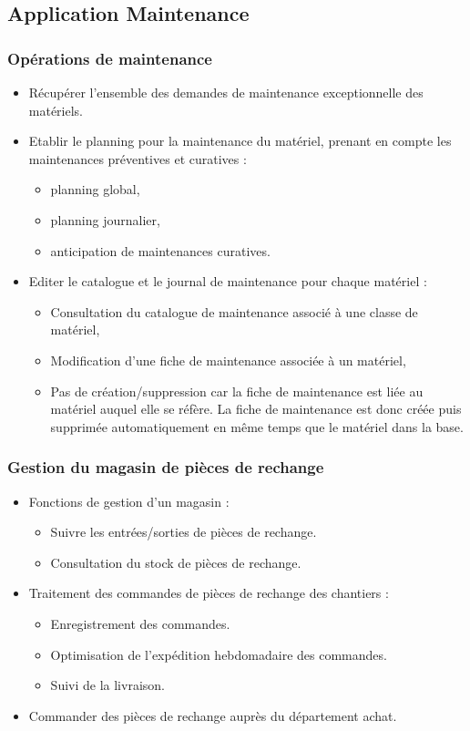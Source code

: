 \subsection{Application Maintenance}
\subsubsection{Opérations de maintenance}
\begin{itemize}
\item Récupérer l'ensemble des demandes de maintenance exceptionnelle
des matériels.
\item Etablir le planning pour la maintenance du matériel, prenant en
compte les maintenances préventives et curatives :
    \begin{itemize}
    \item planning global,
    \item planning journalier,
    \item anticipation de maintenances curatives.
    \end{itemize}
\item Editer le catalogue et le  journal de maintenance pour chaque matériel :
    \begin{itemize}
    \item Consultation du catalogue de maintenance associé à une classe de 
    matériel,
    \item Modification d'une fiche de maintenance associée à un matériel,
    \item Pas de création/suppression car la fiche de maintenance est liée
    au matériel auquel elle se réfère. La fiche de maintenance est donc
    créée puis supprimée automatiquement en même temps que le matériel dans
    la base.
    \end{itemize}
\end{itemize}

\subsubsection{Gestion du magasin de pièces de rechange}
\begin{itemize}
\item Fonctions de gestion d'un magasin :
    \begin{itemize}
    \item Suivre les entrées/sorties de pièces de rechange.
    \item Consultation du stock de pièces de rechange.
    \end{itemize}
\item Traitement des commandes de pièces de rechange des chantiers :
    \begin{itemize}
    \item Enregistrement des commandes.
    \item Optimisation de l'expédition hebdomadaire des commandes.
    \item Suivi de la livraison.
    \end{itemize}
\item Commander des pièces de rechange auprès du département achat.
\end{itemize}

